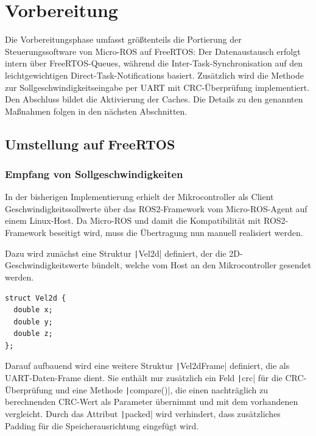 \section{Vorbereitung}

Die Vorbereitungsphase umfasst größtenteils die Portierung der
Steuerungssoftware von Micro-ROS auf FreeRTOS: Der Datenaustausch erfolgt intern
über FreeRTOS-Queues, während die Inter-Task-Synchronisation auf den
leichtgewichtigen Direct-Task-Notifications basiert. Zusätzlich wird die Methode
zur Sollgeschwindigkeitseingabe per UART mit CRC-Überprüfung implementiert. Den
Abschluss bildet die Aktivierung der Caches. Die Details zu den genannten
Maßnahmen folgen in den nächsten Abschnitten.

\subsection{Umstellung auf FreeRTOS}

\subsubsection{Empfang von Sollgeschwindigkeiten}

In der bisherigen Implementierung erhielt der Mikrocontroller als Client
Geschwindigkeitssollwerte über das ROS2-Framework vom Micro-ROS-Agent auf einem
Linux-Host. Da Micro-ROS und damit die Kompatibilität mit ROS2-Framework
beseitigt wird, muss die Übertragung nun manuell realisiert werden.

Dazu wird zunächst eine Struktur \texttt|Vel2d| definiert, der die
2D-Geschwindigkeitswerte bündelt, welche vom Host an den Mikrocontroller
gesendet werden.

\begin{code}
\begin{verbatim}
struct Vel2d {
  double x;
  double y;
  double z;
};
\end{verbatim}
\end{code}

Darauf aufbauend wird eine weitere Struktur \texttt|Vel2dFrame|
definiert, die als UART-Daten-Frame dient. Sie enthält nur zusätzlich ein Feld
\texttt|crc| für die CRC-Überprüfung und eine Methode
\texttt|compare()|, die einen nachträglich zu berechnenden CRC-Wert als
Parameter übernimmt und mit dem vorhandenen vergleicht. Durch das Attribut
\texttt|packed| wird verhindert, dass zusätzliches Padding für die
Speicherausrichtung eingefügt wird.

